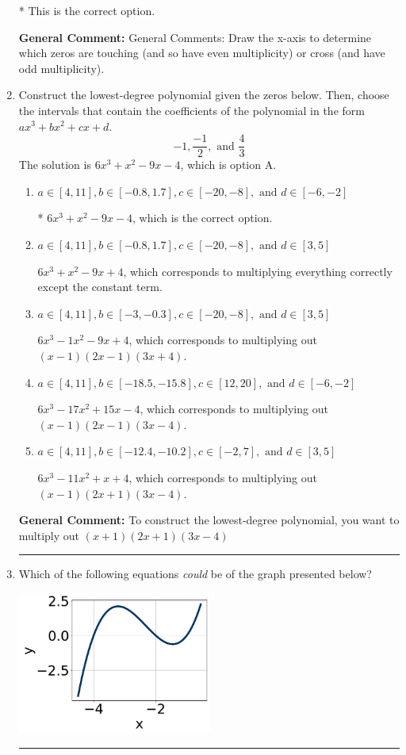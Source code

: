 \documentclass{extbook}[14pt]
\newcommand{\litem}[1]{\item #1

\rule{\textwidth}{0.4pt}}
\begin{document}
\begin{enumerate}
{\begin{enumerate}[label=\Alph*.]
* This is the correct option.
\end{enumerate}

\textbf{General Comment:} General Comments: Draw the x-axis to determine which zeros are touching (and so have even multiplicity) or cross (and have odd multiplicity).
}
\litem{
Construct the lowest-degree polynomial given the zeros below. Then, choose the intervals that contain the coefficients of the polynomial in the form $ax^3+bx^2+cx+d$.
\[ -1, \frac{-1}{2}, \text{ and } \frac{4}{3} \]The solution is \( 6x^{3} + x^{2} -9 x -4 \), which is option A.\begin{enumerate}[label=\Alph*.]
\item \( a \in [4, 11], b \in [-0.8, 1.7], c \in [-20, -8], \text{ and } d \in [-6, -2] \)

* $6x^{3} + x^{2} -9 x -4$, which is the correct option.
\item \( a \in [4, 11], b \in [-0.8, 1.7], c \in [-20, -8], \text{ and } d \in [3, 5] \)

$6x^{3} + x^{2} -9 x + 4$, which corresponds to multiplying everything correctly except the constant term.
\item \( a \in [4, 11], b \in [-3, -0.3], c \in [-20, -8], \text{ and } d \in [3, 5] \)

$6x^{3} -1 x^{2} -9 x + 4$, which corresponds to multiplying out $(x -1)(2x -1)(3x + 4)$.
\item \( a \in [4, 11], b \in [-18.5, -15.8], c \in [12, 20], \text{ and } d \in [-6, -2] \)

$6x^{3} -17 x^{2} +15 x -4$, which corresponds to multiplying out $(x -1)(2x -1)(3x -4)$.
\item \( a \in [4, 11], b \in [-12.4, -10.2], c \in [-2, 7], \text{ and } d \in [3, 5] \)

$6x^{3} -11 x^{2} +x + 4$, which corresponds to multiplying out $(x -1)(2x + 1)(3x -4)$.
\end{enumerate}

\textbf{General Comment:} To construct the lowest-degree polynomial, you want to multiply out $(x + 1)(2x + 1)(3x -4)$
}
\litem{
Which of the following equations \textit{could} be of the graph presented below?

\begin{center}
    \includegraphics[width=0.5\textwidth]{../Figures/polyGraphToFunctionA.png}
\end{center}


}
\end{enumerate}
\end{document}
